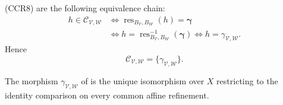 \begin{definition}
  (CCR8) are the following equivalence chain:
  \[
  \begin{aligned}
    h\in\mathscr C_{\mathcal V,\mathcal W}
      &\Longleftrightarrow
        \operatorname{res}_{B_{\mathcal V},B_{\mathcal W}}(h)
          =\boldsymbol\gamma\\
      &\Longleftrightarrow
        h=\operatorname{res}_{B_{\mathcal V},B_{\mathcal W}}^{-1}
          (\boldsymbol\gamma)
       \Longleftrightarrow h=\gamma_{\mathcal V,\mathcal W}.
  \end{aligned}
  \]
  Hence
  \[
    \mathscr C_{\mathcal V,\mathcal W}
      =\{\gamma_{\mathcal V,\mathcal W}\}.                       \tag{CCR9}
  \]
\end{definition}

\begin{proposition}
  \label{prop:nagata-global-blowup-cover-independent}

  The morphism $\gamma_{\mathcal V,\mathcal W}$ of
   is the unique isomorphism
  over $X$ restricting
  to the identity comparison on every common affine refinement.
\end{proposition}

